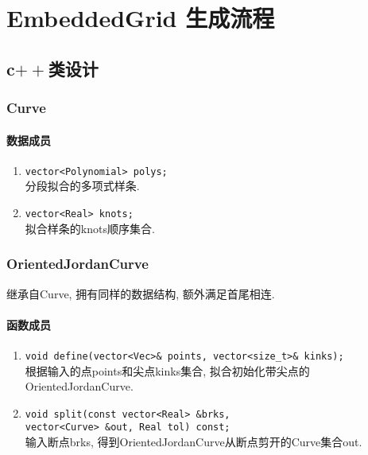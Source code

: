 \documentclass[a4paper]{book}
\numberwithin{equation}{chapter}
\theoremstyle{definition}
\begin{document}
\pagestyle{plain}




\setcounter{chapter}{0}



\chapter{EmbeddedGrid 生成流程}

\section{c$++$类设计}
\subsection{Curve}
\subsubsection{数据成员}
\begin{enumerate}
  \item \texttt{vector<Polynomial> polys;} \\
        分段拟合的多项式样条.

  \item \texttt{vector<Real> knots;} \\
        拟合样条的knots顺序集合.
\end{enumerate}

\subsection{OrientedJordanCurve}
继承自Curve, 拥有同样的数据结构, 额外满足首尾相连.

\subsubsection{函数成员}
\begin{enumerate}
  \item \texttt{void define(vector<Vec>\& points, vector<size\_t>\& kinks);} \\
        根据输入的点points和尖点kinks集合, 拟合初始化带尖点的OrientedJordanCurve.

  \item \texttt{void split(const vector<Real> \&brks,\\
          vector<Curve> \&out, Real tol) const;} \\
        输入断点brks, 得到OrientedJordanCurve从断点剪开的Curve集合out.
\end{enumerate}
\end{document}
